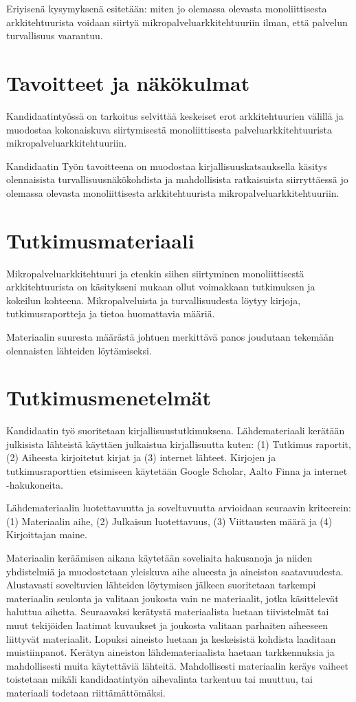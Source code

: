 \documentclass[12pt,a4paper,finnish,oneside]{article}
\begin{document}
Eriyisenä kysymyksenä esitetään: miten jo olemassa olevasta monoliittisesta 
arkkitehtuurista voidaan siirtyä mikropalveluarkkitehtuuriin ilman, että 
palvelun turvallisuus vaarantuu.

\section{Tavoitteet ja näkökulmat}

Kandidaatintyössä on tarkoitus selvittää keskeiset erot arkkitehtuurien välillä ja muodostaa kokonaiskuva 
siirtymisestä monoliittisesta palveluarkkitehtuurista mikropalveluarkkitehtuuriin.

Kandidaatin Työn tavoitteena on muodostaa kirjallisuuskatsauksella käsitys olennaisista turvallisuusnäkökohdista 
ja mahdollisista ratkaisuista siirryttäessä jo olemassa olevasta monoliittisesta arkkitehtuurista mikropalveluarkkitehtuuriin.

\section{Tutkimusmateriaali}

Mikropalveluarkkitehtuuri ja etenkin siihen siirtyminen monoliittisestä arkkitehtuurista on 
käsitykseni mukaan ollut voimakkaan tutkimuksen ja kokeilun kohteena. 
Mikropalveluista ja turvallisuudesta löytyy kirjoja, tutkimusraportteja 
ja tietoa huomattavia määriä.

Materiaalin suuresta määrästä johtuen merkittävä panos joudutaan tekemään 
olennaisten lähteiden löytämiseksi.

\section{Tutkimusmenetelmät}


Kandidaatin työ suoritetaan kirjallisuustutkimuksena. Lähdemateriaali kerätään julkisista 
lähteistä käyttäen julkaistua kirjallisuutta kuten: 
(1) Tutkimus raportit, 
(2) Aiheesta kirjoitetut kirjat ja 
(3) internet lähteet.
Kirjojen ja tutkimusraporttien etsimiseen käytetään Google Scholar, Aalto Finna ja internet -hakukoneita.

Lähdemateriaalin luotettavuutta ja soveltuvuutta arvioidaan seuraavin kriteerein: 
(1) Materiaalin aihe, 
(2) Julkaisun luotettavuus, 
(3) Viittausten määrä ja 
(4) Kirjoittajan maine.

Materiaalin keräämisen aikana käytetään soveliaita hakusanoja ja niiden yhdistelmiä ja 
muodostetaan yleiskuva aihe alueesta ja aineiston saatavuudesta.
Alustavasti soveltuvien lähteiden löytymisen jälkeen suoritetaan tarkempi 
materiaalin seulonta ja valitaan joukosta vain ne materiaalit, jotka käsittelevät 
haluttua aihetta.
Seuraavaksi kerätystä materiaalista luetaan tiivistelmät tai muut tekijöiden 
laatimat kuvaukset ja joukosta valitaan parhaiten aiheeseen liittyvät materiaalit.
Lopuksi aineisto luetaan ja keskeisistä kohdista laaditaan muistiinpanot. 
Kerätyn aineiston lähdemateriaalista haetaan tarkkennuksia ja mahdollisesti 
muita käytettäviä lähteitä.
Mahdollisesti materiaalin keräys vaiheet toistetaan mikäli kandidaatintyön 
aihevalinta tarkentuu tai muuttuu, tai materiaali todetaan riittämättömäksi.
\end{document}
